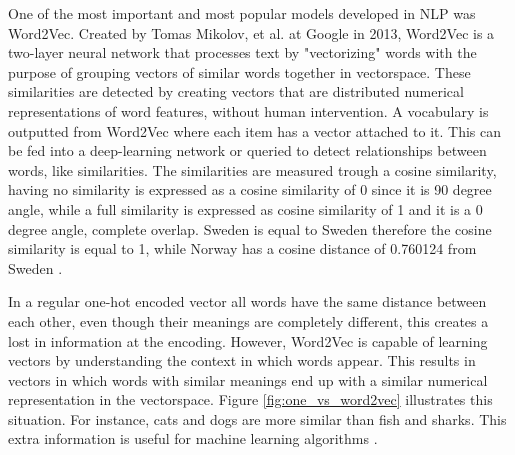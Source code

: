        One of the most important and most popular models developed in NLP was Word2Vec. Created by Tomas Mikolov, et al. \cite{Mikolov2013} at Google in 2013, Word2Vec is a two-layer neural network that processes text by "vectorizing" words with the purpose of grouping vectors of similar words together in vectorspace. These similarities are detected by creating vectors that are distributed numerical representations of word features, without human intervention. A vocabulary is outputted from Word2Vec where each item has a vector attached to it. This can be fed into a deep-learning network or queried to detect relationships between words, like similarities. The similarities are measured trough a cosine similarity, having no similarity is expressed as a cosine similarity of 0 since it is 90 degree angle, while a full similarity is expressed as cosine similarity of 1 and it is a 0 degree angle, complete overlap. Sweden is equal to Sweden therefore the cosine similarity is equal to 1, while Norway has a cosine distance of 0.760124 from Sweden \cite{Wiki}.
        
        


        In a regular one-hot encoded vector all words have the same distance between each other, even though their meanings are completely different, this creates a lost in information at the encoding.  However, Word2Vec is capable of learning vectors by understanding the context in which words appear. This results in vectors in which words with similar meanings end up with a similar numerical representation in the vectorspace. Figure \ref{fig:one_vs_word2vec} illustrates this situation. For instance, cats and dogs are more similar than fish and sharks. This extra information is useful for machine learning algorithms \cite{word2vec_explained}.	


